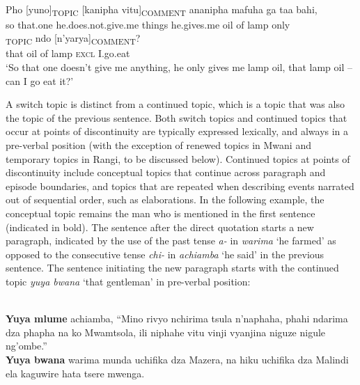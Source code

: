 \documentclass[output=paper]{langsci/langscibook}
\begin{document}
\ea\label{ex:}
\\
\gll Pho [yuno]\textsubscript{TOPIC} [kanipha vitu]\textsubscript{COMMENT}\textsubscript{ }ananipha mafuha ga taa bahi,\\
so that.one he.does.not.give.me things he.gives.me oil of lamp only\\


\textsubscript{TOPIC} ndo [n’yarya]\textsubscript{COMMENT}?\\
that oil of lamp \textsc{excl} I.go.eat\\

\glt \textup{‘So t}\textup{hat one doesn’t give me anything, he only gives me lamp oil, that lamp oil – can I g}\textup{o eat it?’}
\z

A switch topic is distinct from a continued topic, which is a topic that was also the topic of the previous sentence. Both switch topics and continued topics that occur at points of discontinuity are typically expressed lexically, and always in a pre-verbal position (with the exception of renewed topics in Mwani and temporary topics in Rangi, to be discussed below). Continued topics at points of discontinuity include conceptual topics that continue across paragraph and episode boundaries, and topics that are repeated when describing events narrated out of sequential order, such as elaborations. In the following example, the conceptual topic remains the man who is mentioned in the first sentence (indicated in bold). The sentence after the direct quotation starts a new paragraph, indicated by the use of the past tense \textit{a}\textit{\nobreakdash-} in \textit{w}\textit{a}\textit{rima} ‘he farmed’ as opposed to the consecutive tense \textit{chi}\textit{\nobreakdash-} in \textit{a}\textit{chi}\textit{amba} ‘he said’ in the previous sentence. The sentence initiating the new paragraph starts with the continued topic \textit{yuya bwana} ‘that gentleman’ in pre-verbal position:

\ea\label{ex:}
\\
\textbf{Yuy}\textbf{a mlume} achiamba, “Mino rivyo nchirima tsula n’naphaha, phahi ndarima dza phapha na ko Mwamtsola, ili niphahe vitu vinji vyanjina niguze nigule ng'ombe.”\\
\textbf{Yuya bwana} warima munda uchifika dza Mazera, na hiku uchifika dza Malindi ela kaguwire hata tsere mwenga.\\
\end{document}
